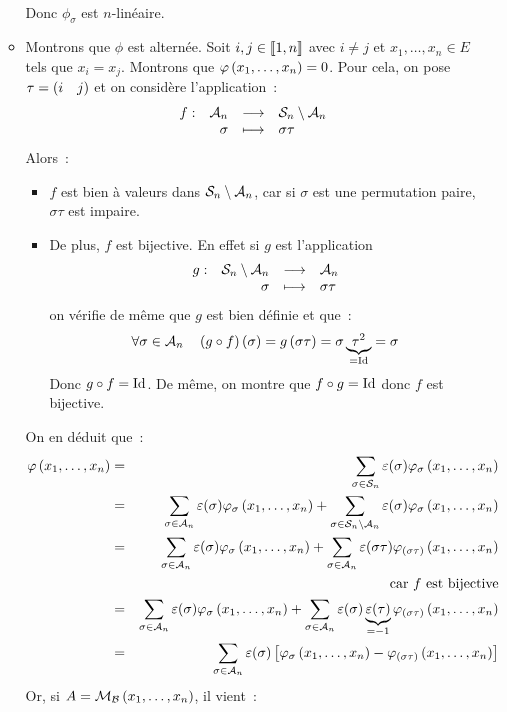 \documentclass{magnolia}
\begin{document}
\begin{preuve}
\begin{itemize}
\begin{itemize}
\begin{eqnarray*}
    \end{eqnarray*}
    Donc $\phi_\sigma$ est $n$-linéaire.
  \item Montrons que $\phi$ est alternée. Soit $i,j\in\left\llbracket 1,n\right\rrbracket$ avec
    $i\neq j$ et $x_1,\ldots,x_n\in E$ tels que $x_i=x_j$. Montrons que
    $\varphi\left(x_1,\ldots,x_n\right)=0$. Pour cela, on pose $\tau=\left(i \quad j\right)$ et on
    considère l'application~:
    \[\begin{array}[t]{lrcl} \displaystyle{f} : & \displaystyle{\mathcal{A}_{n}} & \longrightarrow & \displaystyle{\mathcal{S}_{n}\setminus\mathcal{A}_{n}} \\ & \displaystyle{\sigma} & \longmapsto & \displaystyle{\sigma \tau} \end{array}\]
    Alors~:
    \begin{itemize}
    \item $f$ est bien à valeurs dans $\mathcal{S}_{n}\setminus\mathcal{A}_{n}$, car si
      $\sigma$ est une permutation paire, $\sigma\tau$ est impaire.
    \item De plus, $f$ est bijective. En effet si $g$ est l'application
      \[\begin{array}[t]{lrcl} \displaystyle{g} : & \displaystyle{\mathcal{S}_{n}\setminus\mathcal{A}_{n}} & \longrightarrow & \displaystyle{\mathcal{A}_{n}} \\ & \displaystyle{\sigma} & \longmapsto & \displaystyle{\sigma \tau} \end{array}\]
      on vérifie de même que $g$ est bien définie et que~:
      \[\forall \sigma\in \mathcal{A}_{n} \quad
        \left(g\circ f\right)\left(\sigma\right)=g\left(\sigma \tau\right)=\sigma\underbrace{\tau^2}_{=\operatorname{Id}}=
        \sigma\]
      Donc $g\circ f=\operatorname{Id}$. De même, on montre que $f\circ g=\operatorname{Id}$ donc $f$
      est bijective.     
    \end{itemize}
    On en déduit que~:
    \begin{eqnarray*}
    \phi\p{x_1,\ldots,x_n}
    &=& \sum_{\sigma\in\gsym{n}} \signat{\sigma} \phi_{\sigma}\p{x_1,\ldots,x_n}\\
    &=& \sum_{\sigma\in \galt{n}} \signat{\sigma} \phi_{\sigma}\p{x_1,\ldots,x_n}+
        \sum_{\sigma\in \gsym{n}\setminus\galt{n}} \signat{\sigma}
        \phi_{\sigma}\p{x_1,\ldots,x_n}\\
    &=& \sum_{\sigma\in \galt{n}} \signat{\sigma} \phi_{\sigma}\p{x_1,\ldots,x_n}+
        \sum_{\sigma\in \galt{n}} \signat{\sigma \tau}
        \phi_{\p{\sigma\tau}}\p{x_1,\ldots,x_n}\\
    & & \text{car $f$ est bijective}\\
    &=& \sum_{\sigma\in \galt{n}} \signat{\sigma} \phi_{\sigma}\p{x_1,\ldots,x_n}+
        \sum_{\sigma\in \galt{n}} \signat{\sigma} \underbrace{\signat{\tau}}_{=-1}
        \phi_{\p{\sigma\tau}}\p{x_1,\ldots,x_n}\\
    &=& \sum_{\sigma\in \galt{n}} \signat{\sigma}
        \cro{\phi_{\sigma}\p{x_1,\ldots,x_n}-
             \phi_{\p{\sigma\tau}}\p{x_1,\ldots,x_n}}
    \end{eqnarray*}
    Or, si $A=\mathcal{M}_{\mathcal{B}}\left(x_1,\ldots,x_n\right)$, il vient~:
    \begin{eqnarray*}

\end{eqnarray*}
\end{itemize}
\end{itemize}
\end{preuve}
\end{document}
